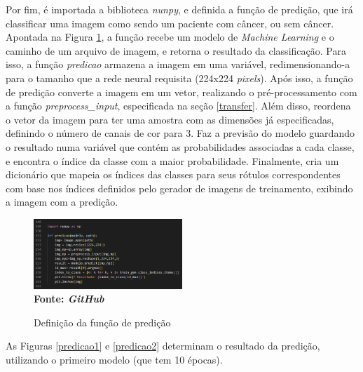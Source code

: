 Por fim, é importada a biblioteca \textit{nunpy}, e definida a função de predição, que irá classificar uma imagem como sendo um paciente com câncer, ou sem câncer. Apontada na Figura \ref{fig:predicao}, a função recebe um modelo de \textit{Machine Learning} e o caminho de um arquivo de imagem, e retorna o resultado da classificação. Para isso, a função \textit{predicao} armazena a imagem em uma variável, redimensionando-a para o tamanho que a rede neural requisita (224x224 \textit{pixels}). Após isso, a função de predição converte a imagem em um vetor, realizando o pré-processamento com a função  \textit{preprocess\_input}, especificada na seção \ref{transfer}. Além disso, reordena o vetor da imagem para ter uma amostra com as dimensões já especificadas, definindo o número de canais de cor para 3. Faz a previsão do modelo guardando o resultado numa variável que contém as probabilidades associadas a cada classe, e encontra o índice da classe com a maior probabilidade. Finalmente, cria um dicionário que mapeia os índices das classes para seus rótulos correspondentes com base nos índices definidos pelo gerador de imagens de treinamento, exibindo a imagem com a predição.


\begin{figure}[ht]
 	\centering	
 	\caption[\hspace{0.1cm}Grade Computacional.]{Definição da função de predição}
 	\vspace{-0.4cm}
 	\includegraphics[width=0.5\textwidth]{figuras/predicao.png}
 	\captionsetup{justification=centering}
	\vspace{-0.2cm}
     \\\textbf{\footnotesize Fonte: \textit{GitHub}}
	\label{fig:predicao}
\end{figure}

As Figuras \ref{predicao1} e \ref{predicao2} determinam o resultado da predição, utilizando o primeiro modelo (que tem 10 épocas). 

